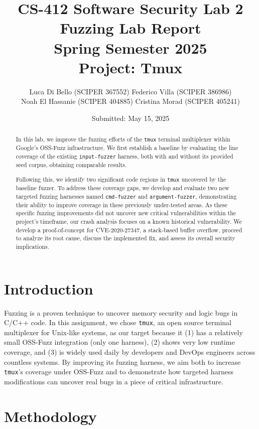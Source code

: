 \documentclass[11pt,a4paper,twocolumn]{article}
\title{%
  CS-412 Software Security Lab 2\\[0.5em]
  \Large Fuzzing Lab Report\\
  Spring Semester 2025\\[0.5em]
  Project: Tmux
}
\author{%
  Luca Di Bello (SCIPER 367552)
  Federico Villa (SCIPER 386986) \\
  Noah El Hassanie (SCIPER 404885)
  Cristina Morad (SCIPER 405241) \\
}
\date{Submitted: May 15, 2025}
\begin{document}
\maketitle

\begin{abstract}
    In this lab, we improve the fuzzing efforts of the \texttt{tmux} terminal
    multiplexer within Google's OSS-Fuzz infrastructure. We first establish a
    baseline by evaluating the line coverage of the existing \texttt{input-fuzzer}
    harness, both with and without its provided seed corpus, obtaining comparable results.

    Following this, we identify two significant code regions in \texttt{tmux} uncovered
    by the baseline fuzzer. To address these coverage gaps, we develop
    and evaluate two new targeted fuzzing harnesses named \texttt{cmd-fuzzer}
    and \texttt{argument-fuzzer}, demonstrating their ability to improve coverage in these
    previously under-tested areas. As these specific fuzzing improvements did not uncover
    new critical vulnerabilities within the project's timeframe, our crash analysis
    focuses on a known historical vulnerability. We develop a proof-of-concept for
    CVE-2020-27347, a stack-based buffer overflow, proceed to analyze its
    root cause, discuss the implemented fix, and assess its overall security implications.
\end{abstract}

\section*{Introduction}
\label{sec:introduction}

Fuzzing is a proven technique to uncover memory security and logic bugs in
C/C++ code. In this assignment, we chose \texttt{tmux}, an open source terminal
multiplexer for Unix-like systems, as our target because it (1) has a relatively
small OSS-Fuzz integration (only one harness), (2) shows very low runtime
coverage, and (3) is widely used daily by developers and DevOps engineers across
countless systems. By improving its fuzzing harness, we aim both to increase
\texttt{tmux}'s coverage under OSS-Fuzz and to demonstrate how targeted harness
modifications can uncover real bugs in a piece of critical infrastructure.

\section*{Methodology}
\label{sec:methodology}
\end{document}

